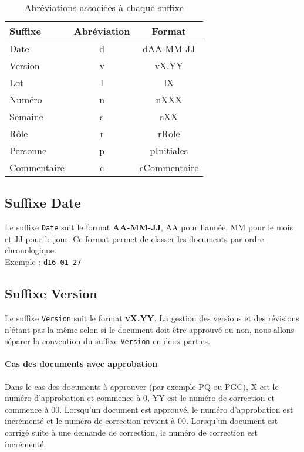 	\begin{table}[H]
		\centering
		\begin{tabularx}{10cm}{|X|c|c|}
		\hline
		\rowcolor[gray]{0.85} Suffixe & Abréviation & Format\\
		\hline
		Date & d & dAA-MM-JJ\\
		\hline
		Version & v & vX.YY\\
		\hline
		Lot & l & lX\\		
		\hline
		Numéro & n & nXXX\\
		\hline
		Semaine & s & sXX\\
		\hline
		Rôle & r & rRole\\
		\hline
		Personne & p & pInitiales\\
		\hline
		Commentaire & c & cCommentaire\\
		\hline
		\end{tabularx}
	\caption{Abréviations associées à chaque suffixe}
	\label{Suffixes}
	\end{table}
	


\subsection{Suffixe Date}
\label{suffixe_date}

Le suffixe \verb+Date+ suit le format \textbf{AA-MM-JJ}, AA pour l'année, MM pour le mois et JJ pour le jour. Ce format permet de classer les documents par ordre chronologique.\\

Exemple : \verb+d16-01-27+

\subsection{Suffixe Version}
\label{suffixe_version}
Le suffixe \verb+Version+ suit le format \textbf{vX.YY}. La gestion des versions et des révisions n'étant pas la même selon si le document doit être approuvé ou non, nous allons séparer la convention du suffixe \verb+Version+ en deux parties. \\

\paragraph{Cas des documents avec approbation\\}

Dans le cas des documents à approuver (par exemple PQ ou PGC), X est le numéro d'approbation et commence à 0, YY est le numéro de correction et commence à 00. Lorsqu'un document est approuvé, le numéro d'approbation est incrémenté et le numéro de correction revient à 00. Lorsqu'un document est corrigé suite à une demande de correction, le numéro de correction est incrémenté.

